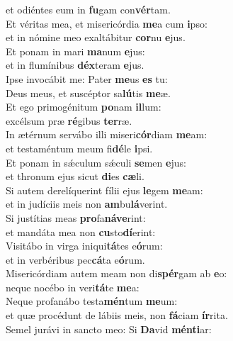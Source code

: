 \oddverse et odiéntes eum in \textbf{fu}gam con\textbf{vér}tam.\\
\evenverse Et véritas mea, et misericórdia \textbf{me}a cum \textbf{i}pso:~\*\\
\evenverse et in nómine meo exaltábitur \textbf{cor}nu \textbf{e}jus.\\
\oddverse Et ponam in mari \textbf{ma}num \textbf{e}jus:~\*\\
\oddverse et in flumínibus \textbf{déx}teram \textbf{e}jus.\\
\evenverse Ipse invocábit me: Pater \textbf{me}us \textbf{es} tu:~\*\\
\evenverse Deus meus, et suscéptor sa\textbf{lú}tis \textbf{me}æ.\\
\oddverse Et ego primogénitum \textbf{po}nam \textbf{il}lum:~\*\\
\oddverse excélsum præ \textbf{ré}gibus \textbf{ter}ræ.\\
\evenverse In ætérnum servábo illi miseri\textbf{cór}diam \textbf{me}am:~\*\\
\evenverse et testaméntum meum fi\textbf{dé}le \textbf{i}psi.\\
\oddverse Et ponam in sǽculum sǽculi \textbf{se}men \textbf{e}jus:~\*\\
\oddverse et thronum ejus sicut \textbf{di}es \textbf{cæ}li.\\
\evenverse Si autem derelíquerint fílii ejus \textbf{le}gem \textbf{me}am:~\*\\
\evenverse et in judíciis meis non \textbf{am}bu\textbf{lá}verint.\\
\oddverse Si justítias meas \textbf{pro}fa\textbf{ná}\textbf{ve}rint:~\*\\
\oddverse et mandáta mea non \textbf{cu}sto\textbf{dí}erint:\\
\evenverse Visitábo in virga iniqui\textbf{tá}tes e\textbf{ó}rum:~\*\\
\evenverse et in verbéribus pec\textbf{cá}ta e\textbf{ó}rum.\\
\oddverse Misericórdiam autem meam non di\textbf{spér}gam ab \textbf{e}o:~\*\\
\oddverse neque nocébo in veri\textbf{tá}te \textbf{me}a:\\
\evenverse Neque profanábo testa\textbf{mén}tum \textbf{me}um:~\*\\
\evenverse et quæ procédunt de lábiis meis, non \textbf{fá}ciam \textbf{ír}rita.\\
\oddverse Semel jurávi in sancto meo: Si \textbf{Da}vid \textbf{mén}\textbf{ti}ar:~\*\\
